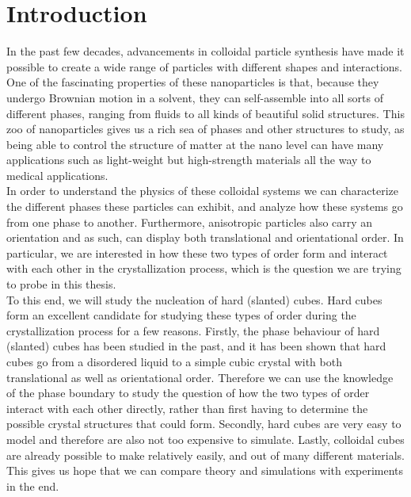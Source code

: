 \documentclass[thesis]{subfiles}
\begin{document}
\part{Introduction}

In the past few decades, advancements in colloidal particle synthesis have made it possible to create a wide range of particles with different shapes and interactions\cite{glotzer2007anisotropy}. One of the fascinating properties of these nanoparticles is that, because they undergo Brownian motion in a solvent, they can self-assemble into all sorts of different phases, ranging from fluids to all kinds of beautiful solid structures. This zoo of nanoparticles gives us a rich sea of phases and other structures to study, as being able to control the structure of matter at the nano level can have many applications such as  light-weight but high-strength materials all the way to medical applications.\\

In order to understand the physics of these colloidal systems we can characterize the different phases these particles can exhibit, and analyze how these systems go from one phase to another. Furthermore, anisotropic particles also carry an orientation and as such, can display both translational and orientational order. In particular, we are interested in how these two types of order form and interact with each other in the crystallization process, which is the question we are trying to probe in this thesis.\\

To this end, we will study the nucleation of hard (slanted) cubes. Hard cubes form an excellent candidate for studying these types of order during the crystallization process for a few reasons. Firstly, the phase behaviour of hard (slanted) cubes has been studied in the past\cite{van2017phase,smallenburg2012vacancy}, and it has been shown that hard cubes go from a disordered liquid to a simple cubic crystal with both translational as well as orientational order. Therefore we can use the knowledge of the phase boundary to study the question of how the two types of order interact with each other directly, rather than first having to determine the possible crystal structures that could form. Secondly, hard cubes are very easy to model and therefore are also not too expensive to simulate. Lastly, colloidal cubes are already possible to make relatively easily, and out of many different materials. This gives us hope that we can compare theory and simulations with experiments in the end.

\newpage
\end{document}
